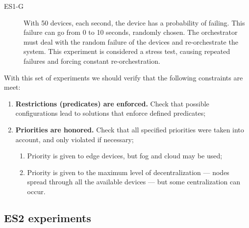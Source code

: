 \begin{description}
    \item[ES1-G] With 50 devices, each second, the device has a probability of failing. This failure can go from 0 to 10 seconds, randomly chosen. The orchestrator must deal with the random failure of the devices and re-orchestrate the system. This experiment is considered a stress test, causing repeated failures and forcing constant re-orchestration.
\end{description}

With this set of experiments we should verify that the following constraints are meet:
\begin{enumerate}
    \item \textbf{Restrictions (predicates) are enforced.} Check that possible configurations lead to solutions that enforce defined predicates;
    \item \textbf{Priorities are honored.} Check that all specified priorities were taken into account, and only violated if necessary;
        \begin{enumerate}
            \item Priority is given to edge devices, but fog and cloud may be used;
            \item Priority is given to the maximum level of decentralization --- nodes spread through all the available devices --- but some centralization can occur.
        \end{enumerate}
\end{enumerate}

\subsection{ES2 experiments}


